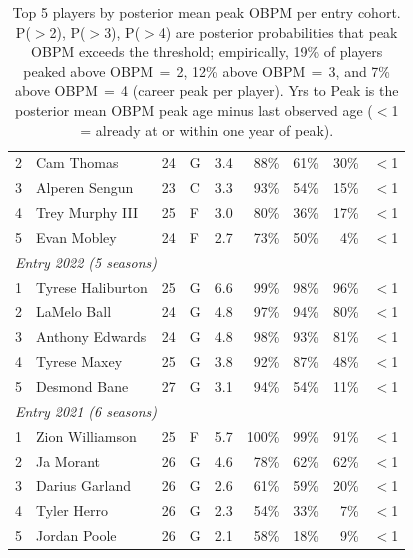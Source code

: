 \begin{table}[htbp]
\begin{tabular}{rlrlrrrrr}
    2 & Cam Thomas & 24 & G & 3.4 & 88\% & 61\% & 30\% & $<$1 \\
    3 & Alperen Sengun & 23 & C & 3.3 & 93\% & 54\% & 15\% & $<$1 \\
    4 & Trey Murphy III & 25 & F & 3.0 & 80\% & 36\% & 17\% & $<$1 \\
    5 & Evan Mobley & 24 & F & 2.7 & 73\% & 50\% & 4\% & $<$1 \\
    \midrule[0.4pt]
    \multicolumn{9}{l}{\textit{Entry 2022 (5 seasons)}} \\
    \midrule
    1 & Tyrese Haliburton & 25 & G & 6.6 & 99\% & 98\% & 96\% & $<$1 \\
    2 & LaMelo Ball & 24 & G & 4.8 & 97\% & 94\% & 80\% & $<$1 \\
    3 & Anthony Edwards & 24 & G & 4.8 & 98\% & 93\% & 81\% & $<$1 \\
    4 & Tyrese Maxey & 25 & G & 3.8 & 92\% & 87\% & 48\% & $<$1 \\
    5 & Desmond Bane & 27 & G & 3.1 & 94\% & 54\% & 11\% & $<$1 \\
    \midrule[0.4pt]
    \multicolumn{9}{l}{\textit{Entry 2021 (6 seasons)}} \\
    \midrule
    1 & Zion Williamson & 25 & F & 5.7 & 100\% & 99\% & 91\% & $<$1 \\
    2 & Ja Morant & 26 & G & 4.6 & 78\% & 62\% & 62\% & $<$1 \\
    3 & Darius Garland & 26 & G & 2.6 & 61\% & 59\% & 20\% & $<$1 \\
    4 & Tyler Herro & 26 & G & 2.3 & 54\% & 33\% & 7\% & $<$1 \\
    5 & Jordan Poole & 26 & G & 2.1 & 58\% & 18\% & 9\% & $<$1 \\
    \bottomrule
  \end{tabular}
  \caption{Top 5 players by posterior mean peak OBPM per entry cohort. P($>$2), P($>$3), P($>$4) are posterior probabilities that peak OBPM exceeds the threshold; empirically, 19\% of players peaked above OBPM\,$=$\,2, 12\% above OBPM\,$=$\,3, and 7\% above OBPM\,$=$\,4 (career peak per player). Yrs to Peak is the posterior mean OBPM peak age minus last observed age ($<$1 = already at or within one year of peak).}
  \label{tab:breakout_cohort}
\end{table}


